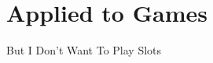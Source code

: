 \documentclass{powerdot}
\begin{document}
\section{Applied to Games}

\begin{slide}{But I Don't Want To Play Slots}
\end{slide}
\end{document}
